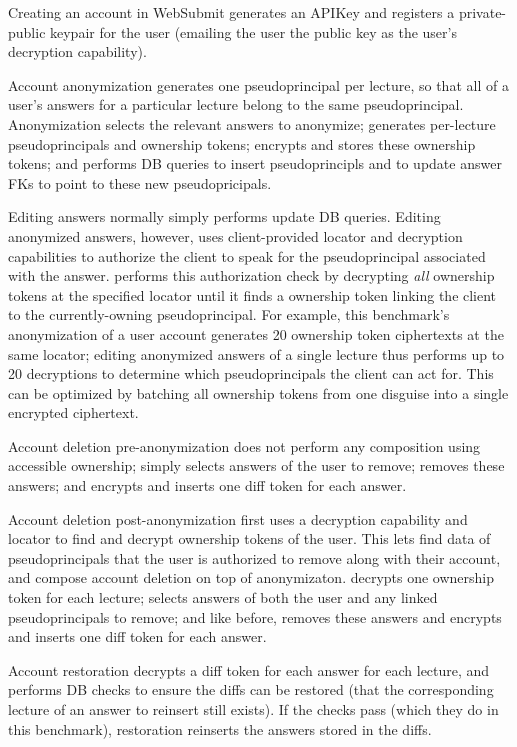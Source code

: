 Creating an account in WebSubmit generates an APIKey and registers a private-public keypair for the
user (emailing the user the public key as the user's decryption capability).

Account anonymization generates one pseudoprincipal per lecture, so that all of a user's answers for
a particular lecture belong to the same pseudoprincipal.  Anonymization selects the relevant answers
to anonymize; generates per-lecture pseudoprincipals and ownership tokens; encrypts and stores these
ownership tokens; and performs DB queries to insert pseudoprincipls and to update answer FKs to
point to these new pseudopricipals.

Editing answers normally simply performs update DB queries. Editing anonymized answers, however,
uses client-provided locator and decryption capabilities to authorize the client to speak for the
pseudoprincipal associated with the answer.  \sys performs this authorization check by decrypting
\emph{all} ownership tokens at the specified locator until it finds a ownership token linking the
client to the currently-owning pseudoprincipal. For example, this benchmark's anonymization of a
user account generates 20 ownership token ciphertexts at the same locator; editing anonymized
answers of a single lecture thus performs up to 20 decryptions to determine which pseudoprincipals
the client can act for. This can be optimized by batching all ownership tokens from one disguise
into a single encrypted ciphertext.

Account deletion pre-anonymization does not perform any composition using accessible ownership; \sys
simply selects answers of the user to remove; removes these answers; and encrypts and inserts one
diff token for each answer.

Account deletion post-anonymization first uses a decryption capability and locator to find and
decrypt ownership tokens of the user. This lets \sys find data of pseudoprincipals that the user is
authorized to remove along with their account, and compose account deletion on top of anonymizaton.
\sys decrypts one ownership token for each lecture; selects answers of both the user and any linked
pseudoprincipals to remove; and like before, removes these answers and encrypts and inserts one diff
token for each answer.

Account restoration decrypts a diff token for each answer for each lecture, and performs DB checks
to ensure the diffs can be restored (\eg that the corresponding lecture of an answer to reinsert
still exists). If the checks pass (which they do in this benchmark), restoration reinserts the
answers stored in the diffs.

